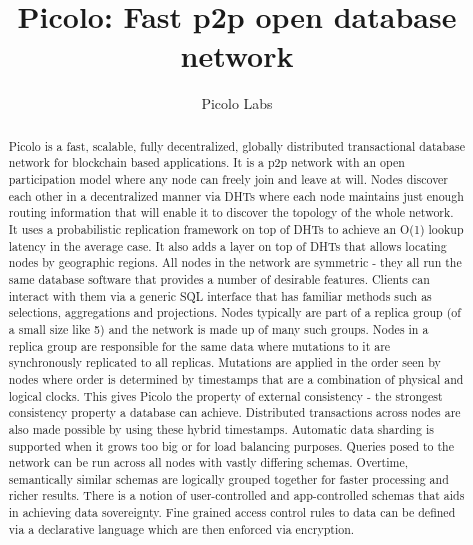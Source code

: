 \documentclass[preprint,10pt]{elsarticle}
\theoremstyle{definition}
\begin{document}
\begin{frontmatter}


\title{Picolo: Fast p2p open database network}

\author{Picolo Labs}
\address{San Francisco, California}

\begin{abstract}
Picolo is a fast, scalable, fully decentralized, globally distributed transactional database network for blockchain based applications. It is a p2p network with an open participation model where any node can freely join and leave at will. Nodes discover each other in a decentralized manner via DHTs where each node maintains just enough routing information that will enable it to discover the topology of the whole network. It uses a probabilistic replication framework on top of DHTs to achieve an O(1) lookup latency in the average case. It also adds a layer on top of DHTs that allows locating nodes by geographic regions.
\newline
\newline
All nodes in the network are symmetric - they all run the same database software that provides a number of desirable features. Clients can interact with them via a generic SQL interface that has familiar methods such as selections, aggregations and projections. Nodes typically are part of a replica group (of a small size like 5) and the network is made up of many such groups. Nodes in a replica group are responsible for the same data where mutations to it are synchronously replicated to all replicas. Mutations are applied in the order seen by nodes where order is determined by timestamps that are a combination of physical and logical clocks. This gives Picolo the property of external consistency - the strongest consistency property a database can achieve. Distributed transactions across nodes are also made possible by using these hybrid timestamps. Automatic data sharding is supported when it grows too big or for load balancing purposes. Queries posed to the network can be run across all nodes with vastly differing schemas. Overtime, semantically similar schemas are logically grouped together for faster processing and richer results. There is a notion of \textsf{user-controlled} and \textsf{app-controlled} schemas that aids in achieving data sovereignty. Fine grained access control rules to data can be defined via a declarative language which are then enforced via encryption.

\end{abstract}
\end{frontmatter}
\end{document}
